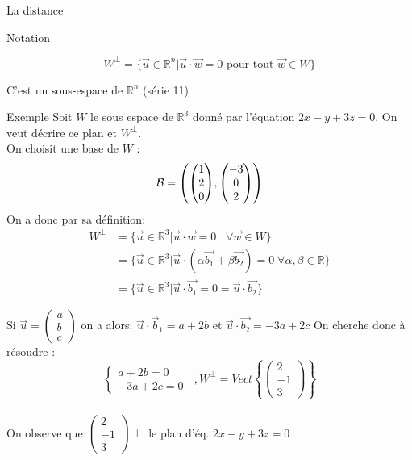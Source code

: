 \begin{parag}{La distance}
\begin{subparag}{Notation}
            \begin{formule}
                \[W^\perp = \{\vec{u} \in \mathbb{R}^n| \vec{u} \cdot \vec{w} = 0 \text{ pour tout } \vec{w} \in W\}\]
            \end{formule}
            C'est un sous-espace de $\mathbb{R}^n$ (série 11)
        \end{subparag}
        \begin{subparag}{Exemple}
            Soit $W$ le sous espace de $\mathbb{R}^3$ donné par l'équation $2x -y + 3z = 0$. On veut décrire ce plan et $W^\perp$.
            \\
            On choisit une base de $W$ : 
            \[\bmath = \left(\begin{pmatrix}
                1 \\ 2 \\ 0
            \end{pmatrix}, \begin{pmatrix}
                -3 \\ 0 \\ 2
            \end{pmatrix}\right)\]
            On a donc par sa définition:
            \begin{align*}
              W^\perp &= \{\vec{u} \in \mathbb{R}^3|  \vec
            u\cdot \vec{w} = 0 \;\;\;\forall \vec{w} \in W\}\\  
            &= \{\vec{u} \in \mathbb{R}^3|\vec{u}\cdot(\alpha\vec{b_1} + \beta\vec{b_2}) = 0 \; \forall\alpha, \beta \in \mathbb{R}\}\\
            &= \{\vec{u} \in \mathbb{R}^3| \vec{u}\cdot\vec{b_1} = 0 = \vec{u}\cdot\vec{b_2}\}
            \end{align*}

            
            Si $\vec{u} = \begin{pmatrix}
                a \\ b \\ c
            \end{pmatrix}$ on a alors: 
            $\vec{u} \cdot \vec{b}_1 = a + 2b$ et $\vec{u}\cdot \vec{b_2} = -3a + 2c$
            On cherche donc à résoudre : 
            \[\begin{cases}
                a + 2b = 0\\
                -3a + 2c = 0
            \end{cases}\; \; , W^\perp = Vect\left\{\begin{pmatrix}
                2 \\ -1 \\ 3
            \end{pmatrix}\right\}\]
            \\
            On observe que $\begin{pmatrix}
                2 \\ -1 \\ 3 
            \end{pmatrix}\perp$ le plan d'éq. $2x -y + 3z = 0$
        \end{subparag}

\end{parag}

